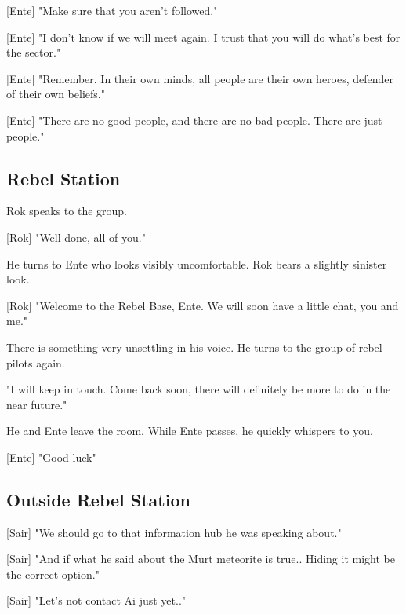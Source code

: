 \documentclass[a4paper,12pt]{article}
\begin{document}
[Ente] "Make sure that you aren't followed."

[Ente] "I don't know if we will meet again. I trust that you will do what's best for the sector."

[Ente] "Remember. In their own minds, all people are their own heroes, defender of their own beliefs."

[Ente] "There are no good people, and there are no bad people. There are just people."

\subsection{Rebel Station}

Rok speaks to the group. 

[Rok] "Well done, all of you."

He turns to Ente who looks visibly uncomfortable. Rok bears a slightly sinister look.

[Rok] "Welcome to the Rebel Base, Ente. We will soon have a little chat, you and me."

There is something very unsettling in his voice. He turns to the group of rebel pilots again.

"I will keep in touch. Come back soon, there will definitely be more to do in the near future."

He and Ente leave the room. While Ente passes, he quickly whispers to you. 

[Ente] "Good luck"

\subsection{Outside Rebel Station}

[Sair] "We should go to that information hub he was speaking about."

[Sair] "And if what he said about the Murt meteorite is true.. Hiding it might be the correct option."

[Sair] "Let's not contact Ai just yet.."
\end{document}
